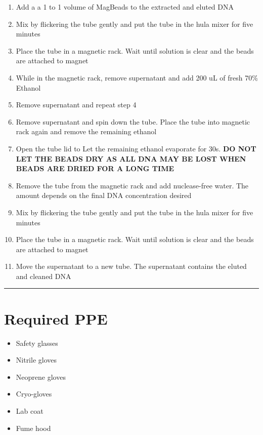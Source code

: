 \documentclass[
]{book}
\begin{document}
\begin{enumerate}
\def\labelenumi{\arabic{enumi}.}
\item
  Add a a 1 to 1 volume of MagBeads to the extracted and eluted DNA
\item
  Mix by flickering the tube gently and put the tube in the hula mixer for five minutes
\item
  Place the tube in a magnetic rack. Wait until solution is clear and the beads are attached to magnet
\item
  While in the magnetic rack, remove supernatant and add 200 uL of fresh 70\% Ethanol
\item
  Remove supernatant and repeat step 4
\item
  Remove supernatant and spin down the tube. Place the tube into magnetic rack again and remove the remaining ethanol
\item
  Open the tube lid to Let the remaining ethanol evaporate for 30s. \textbf{DO NOT LET THE BEADS DRY AS ALL DNA MAY BE LOST WHEN BEADS ARE DRIED FOR A LONG TIME}
\item
  Remove the tube from the magnetic rack and add nuclease-free water. The amount depends on the final DNA concentration desired
\item
  Mix by flickering the tube gently and put the tube in the hula mixer for five minutes
\item
  Place the tube in a magnetic rack. Wait until solution is clear and the beads are attached to magnet
\item
  Move the supernatant to a new tube. The supernatant contains the eluted and cleaned DNA
\end{enumerate}

\begin{center}\rule{0.5\linewidth}{0.5pt}\end{center}

\hypertarget{required-ppe}{%
\section{\texorpdfstring{\textbf{Required PPE}~}{Required PPE~}}\label{required-ppe}}

\begin{itemize}
\item
  Safety glasses~
\item
  Nitrile gloves~
\item
  Neoprene gloves~
\item
  Cryo-gloves~
\item
  Lab coat
\item
  Fume hood~
\end{itemize}
\end{document}
